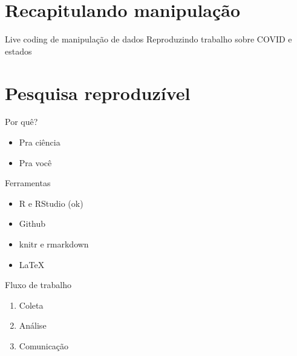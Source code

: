 \documentclass[
  9pt,
  ignorenonframetext,
]{beamer}
\begin{document}
\hypertarget{recapitulando-manipulauxe7uxe3o}{%
\section{Recapitulando
manipulação}\label{recapitulando-manipulauxe7uxe3o}}

\begin{frame}{Live coding de manipulação de dados}
\protect\hypertarget{live-coding-de-manipulauxe7uxe3o-de-dados}{}
Reproduzindo trabalho sobre COVID e estados
\end{frame}

\hypertarget{pesquisa-reproduzuxedvel}{%
\section{Pesquisa reproduzível}\label{pesquisa-reproduzuxedvel}}

\begin{frame}{Por quê?}
\protect\hypertarget{por-quuxea}{}
\begin{itemize}
\item
  Pra ciência
\item
  Pra você
\end{itemize}
\end{frame}

\begin{frame}{Ferramentas}
\protect\hypertarget{ferramentas}{}
\begin{itemize}
\item
  R e RStudio (ok)
\item
  Github
\item
  knitr e rmarkdown
\item
  LaTeX
\end{itemize}
\end{frame}

\begin{frame}{Fluxo de trabalho}
\protect\hypertarget{fluxo-de-trabalho}{}
\begin{enumerate}
\item
  Coleta
\item
  Análise
\item
  Comunicação
\end{enumerate}
\end{frame}
\end{document}

